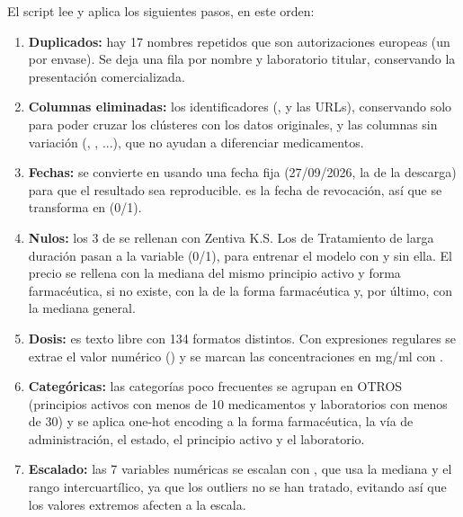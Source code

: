 \documentclass[11pt,a4paper]{article}
\begin{document}
El script lee  y aplica los siguientes pasos, en este orden:
\begin{enumerate}
  \item \textbf{Duplicados:} hay 17 nombres repetidos que son autorizaciones europeas (un 
        por envase). Se deja una fila por nombre y laboratorio titular, conservando la presentación
        comercializada.
  \item \textbf{Columnas eliminadas:} los identificadores (,  y las URLs), conservando solo
         para poder cruzar los clústeres con los datos originales, y las columnas sin
        variación (, , ...), que no ayudan a
        diferenciar medicamentos.
  \item \textbf{Fechas:}  se convierte en  usando una fecha fija
        (27/09/2026, la de la descarga) para que el resultado sea reproducible.  es la
        fecha de revocación, así que se transforma en  (0/1).
  \item \textbf{Nulos:} los 3 de  se rellenan con Zentiva K.S. Los de Tratamiento de
        larga duración pasan a la variable  (0/1), para entrenar el modelo con y sin
        ella. El precio se rellena con la mediana del mismo principio activo y forma farmacéutica,
        si no existe, con la de la forma farmacéutica y, por último, con la mediana general.
  \item \textbf{Dosis:} es texto libre con 134 formatos distintos. Con expresiones regulares se extrae el
        valor numérico () y se marcan las concentraciones en mg/ml con
        .
  \item \textbf{Categóricas:} las categorías poco frecuentes se agrupan en OTROS (principios activos
        con menos de 10 medicamentos y laboratorios con menos de 30) y se aplica one-hot
        encoding a la forma farmacéutica, la vía de administración, el estado, el principio activo y
        el laboratorio.
  \item \textbf{Escalado:} las 7 variables numéricas se escalan con , que usa la mediana
        y el rango intercuartílico, ya que los outliers no se han tratado, evitando así que los valores
        extremos afecten a la escala.
\end{enumerate}
\end{document}
